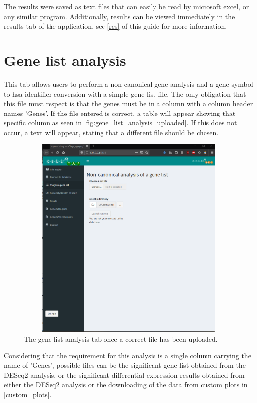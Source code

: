 \documentclass[11pt]{article}
\begin{document}
The results were saved as text files that can easily be read by microsoft excel, or any similar program.
Additionally, results can be viewed immediately in the results tab of the application, see \autoref{res} of this guide for more information.


\section{Gene list analysis \label{gene_list_analysis}}
This tab allows users to perform a non-canonical gene analysis and a gene symbol to hsa identifier conversion with a simple gene list file. The only obligation that this file must respect is that the genes must be in a column with a column header names 'Genes'. If the file entered is correct, a table will appear showing that specific column as seen in \autoref{fig:gene_list_analysis_uploaded}. If this does not occur, a text will appear, stating that a different file should be chosen.
\begin{figure}[h!]
\centering
\includegraphics[width=15cm,height=10cm,keepaspectratio]{gene_list_analysis.png}
\caption{The gene list analysis tab once a correct file has been uploaded.}
\label{fig:gene_list_analysis_uploaded}
\end{figure}

Considering that the requirement for this analysis is a single column carrying the name of 'Genes', possible files can be the significant gene list obtained from the DESeq2 analysis, or the significant differential expression results obtained from either the DESeq2 analysis or the downloading of the data from custom plots in \autoref{custom_plots}.
\end{document}
